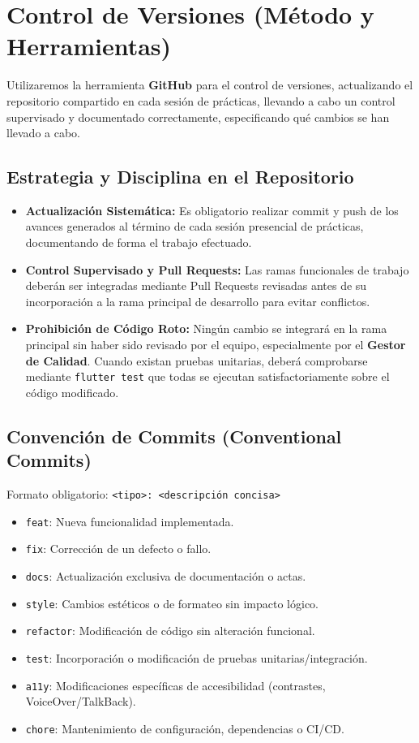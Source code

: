 \newpage
\section{Control de Versiones (Método y Herramientas)}

Utilizaremos la herramienta \textbf{GitHub} para el control de versiones, actualizando el repositorio compartido en cada sesión de prácticas, llevando a cabo un control supervisado y documentado correctamente, especificando qué cambios se han llevado a cabo.

\subsection{Estrategia y Disciplina en el Repositorio}
\begin{itemize}[leftmargin=*]
  \item \textbf{Actualización Sistemática:} Es obligatorio realizar commit y push de los avances generados al término de cada sesión presencial de prácticas, documentando de forma el trabajo efectuado.
  \item \textbf{Control Supervisado y Pull Requests:} Las ramas funcionales de trabajo deberán ser integradas mediante Pull Requests revisadas antes de su incorporación a la rama principal de desarrollo para evitar conflictos.
  \item \textbf{Prohibición de Código Roto:} Ningún cambio se integrará en la rama principal sin haber sido revisado por el equipo, especialmente por el \textbf{Gestor de Calidad}. Cuando existan pruebas unitarias, deberá comprobarse mediante \texttt{flutter test} que todas se ejecutan satisfactoriamente sobre el código modificado.
\end{itemize}

\subsection{Convención de Commits (Conventional Commits)}
Formato obligatorio: \texttt{<tipo>: <descripción concisa>}
\begin{itemize}[leftmargin=*]
  \item \texttt{feat}: Nueva funcionalidad implementada.
  \item \texttt{fix}: Corrección de un defecto o fallo.
  \item \texttt{docs}: Actualización exclusiva de documentación o actas.
  \item \texttt{style}: Cambios estéticos o de formateo sin impacto lógico.
  \item \texttt{refactor}: Modificación de código sin alteración funcional.
  \item \texttt{test}: Incorporación o modificación de pruebas unitarias/integración.
  \item \texttt{a11y}: Modificaciones específicas de accesibilidad (contrastes, VoiceOver/TalkBack).
  \item \texttt{chore}: Mantenimiento de configuración, dependencias o CI/CD.
\end{itemize}
